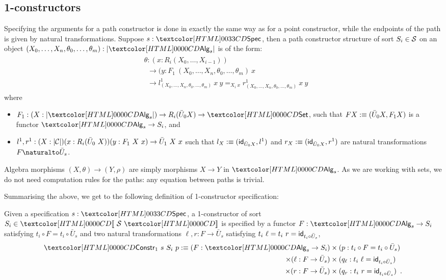 \subsection{1-constructors}

Specifying the arguments for a path constructor is done in exactly the
same way as for a point constructor, while the endpoints of the path
is given by natural transformations. Suppose $s : \specty$, then a path
constructor structure of sort $S_i \in \mathcal{S}$ on an object
$(X_0, \hdots, X_n, \theta_0,\hdots,\theta_m) : | \Alg_s |$ is of the
form:
\begin{align}
\label{eq:theta}
  \begin{split}
    &\theta : (x : R_i (X_0, \hdots, X_{i-1})) \\
    &\ \ \to (y : F_1\ (X_0, \hdots, X_n, \theta_0, \hdots, \theta_m)\ x \\
    &\ \ \to l^1_{(X_0,\hdots,X_n,\theta_0,\hdots,\theta_m)}\ x\ y =_{X_i\ x} r^1_{(X_0,\hdots,X_n,\theta_0,\hdots,\theta_m)}\ x\ y 
  \end{split}
\end{align}
where
\begin{itemize}
\item $F_1 : (X : | \Alg_s |) \to R_i (\bar{U}_0 X) \to \Set$, such
  that $F X :\equiv (\bar{U}_0 X, F_1 X)$ is a functor $\Alg_s \to S_i$, and
\item
  $l^1, r^1 : (X : | \mathcal{C} |) (x : R_i (\bar{U}_0\ X)) (y : F_1\ X\ x)
  \to \bar{U}_1\ X\ x$
  such that $l_X :\equiv (\mathsf{id}_{\bar{U}_0 X}, l^1)$ and
  $r_X :\equiv (\mathsf{id}_{\bar{U}_0 X}, r^1)$ are natural transformations
  $\Nat{F}{\bar{U}_s}$.
\end{itemize}
Algebra morphisms $(X,\theta) \to (Y,\rho)$ are simply morphisms
$X \to Y$ in $\Alg_s$. As we are working with sets, we do not need
computation rules for the paths: any equation between paths is
trivial.

Summarising the above, we get to the following definition of
1-constructor specification:

\begin{definition}
  Given a specification $s : \specty$, a 1-constructor of sort
  $S_i \in \SortCat{\Ss}$ is specified by a functor
  $F : \Alg_s \to S_i$ satisfying $t_i \circ F = t_i \circ \bar{U}_s$
  and two natural transformations $\ell, r : F \to \bar{U}_s$ satisfying
  $t_i\ \ell = t_i\ r = \mathsf{id}_{t_i \circ \bar{U}_s}$, \ie
\begin{align*}
\Constr_1\ s\ S_i\ p \ddefeq (F : \Alg_s \to S_i) &\times (p : t_i \circ F = t_i \circ \bar{U}_s) \\ \times (\ell : F \to \bar{U}_s) &\times (q_\ell : t_i\ \ell = \id_{t_i \circ \bar{U}_s}) \\ \times (r : F \to \bar{U}_s) &\times (q_r : t_i\ r = \id_{t_i \circ \bar{U}_s}) \enspace .
\end{align*}
\end{definition}

